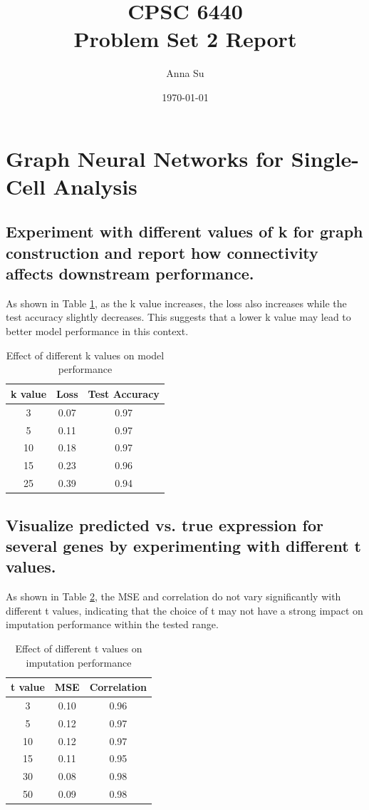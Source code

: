 \documentclass[11pt]{article}
\title{CPSC 6440 \\Problem Set 2 Report}
\author{Anna Su}
\date{\today}
\begin{document}
\maketitle

\section{Graph Neural Networks for Single-Cell Analysis}
\subsection{Experiment with different values of k for graph construction and report how connectivity
affects downstream performance.}

As shown in Table \ref{tab:k_values}, as the k value increases, the loss also increases while the test accuracy slightly decreases. This suggests that a lower k value may lead to better model performance in this context.

    \begin{table}[h!]
    \centering
    \begin{tabular}{|c|c|c|}
    \hline
    k value & Loss & Test Accuracy \\
    \hline
    3 & 0.07 & 0.97 \\
    5 & 0.11 & 0.97 \\
    10 & 0.18 & 0.97 \\
    15 & 0.23 & 0.96 \\
    25 & 0.39 & 0.94 \\
    \hline
    \end{tabular}
    \caption{Effect of different k values on model performance}
    \label{tab:k_values}
    \end{table}

\subsection{Visualize predicted vs. true expression for several genes by experimenting with different t
values.}
As shown in Table \ref{tab:t_values}, the MSE and correlation do not vary significantly with different 
t values, indicating that the choice of t may not have a strong impact on imputation performance within 
the tested range.

    \begin{table}[h!]
    \centering
    \begin{tabular}{|c|c|c|}
    \hline
    t value & MSE & Correlation \\
    \hline
    3 & 0.10 & 0.96 \\
    5 & 0.12 & 0.97 \\
    10 & 0.12 & 0.97 \\
    15 & 0.11 & 0.95 \\
    30 & 0.08 & 0.98 \\
    50 & 0.09 & 0.98 \\
    \hline
    \end{tabular}
    \caption{Effect of different t values on imputation performance}
    \label{tab:t_values}
    \end{table}
\end{document}
